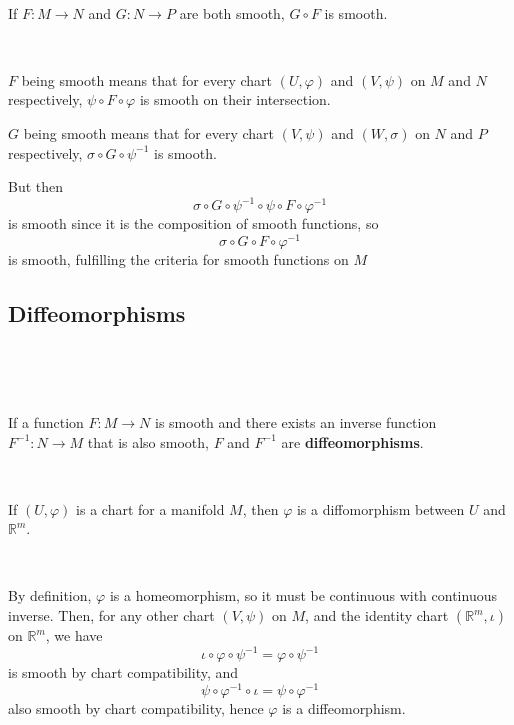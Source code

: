 \documentclass{article}
\begin{document}
\begin{proposition}
  \

  If $F: M \to N$ and $G: N \to P$ are both smooth, $G \circ F$ is smooth.
\end{proposition}

\begin{customproof}
  \

  $F$ being smooth means that for every chart $(U, \varphi)$ and $(V, \psi)$ on $M$ and $N$ respectively, $\psi \circ F \circ \varphi$ is smooth on their intersection.

  $G$ being smooth means that for every chart $(V,\psi)$ and $(W, \sigma)$ on $N$ and $P$ respectively, $\sigma \circ G \circ \psi ^{-1}$ is smooth.

  But then $$\sigma \circ G \circ \psi ^{-1} \circ \psi \circ F \circ \varphi ^{-1}$$is smooth since it is the composition of smooth functions, so $$\sigma \circ G \circ F \circ \varphi ^{-1}$$ is smooth, fulfilling the criteria for smooth functions on $M$
\end{customproof}

\subsection{Diffeomorphisms}
\

\begin{definition}[Diffeomorphisms]
  \

  If a function $F: M\to N$ is smooth and there exists an inverse function $F ^{-1}: N \to M$ that is also smooth, $F$ and $F ^{-1}$ are \textbf{diffeomorphisms}.
\end{definition}

\begin{proposition}
  \

  If $(U, \varphi)$ is a chart for a manifold $M$, then $\varphi$ is a diffomorphism between $U$ and $\mathbb{R}^m$.
\end{proposition}

\begin{customproof}
  \

  By definition, $\varphi$ is a homeomorphism, so it must be continuous with continuous inverse. Then, for any other chart $(V,\psi)$ on $M$, and the identity chart $(\mathbb{R}^m, \iota)$ on $\mathbb{R}^m$, we have $$\iota \circ \varphi \circ \psi ^{-1} = \varphi \circ \psi ^{-1}$$is smooth by chart compatibility, and $$\psi \circ \varphi ^{-1} \circ \iota = \psi \circ \varphi ^{-1}$$also smooth by chart compatibility, hence $\varphi$ is a diffeomorphism.
\end{customproof}
\end{document}
